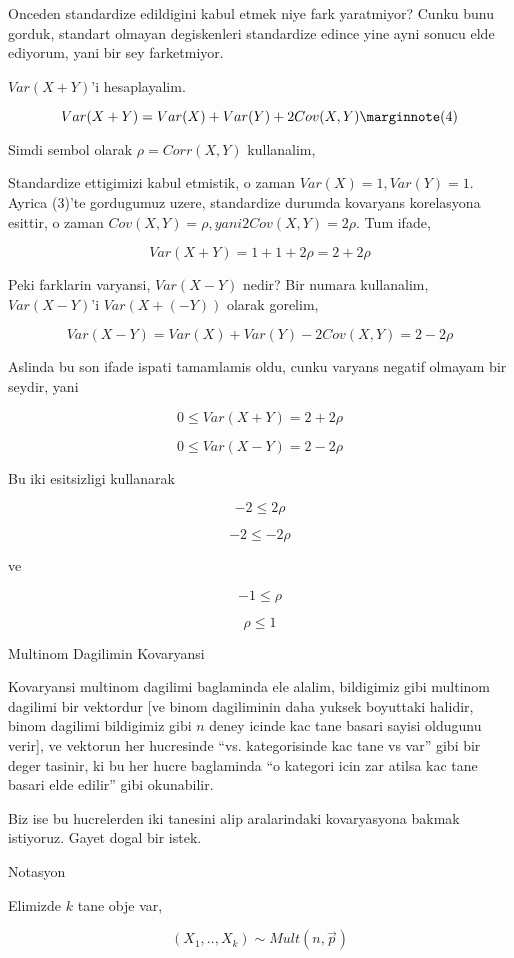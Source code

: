 \documentclass[12pt,fleqn]{article}\usepackage{../common}
\begin{document}
Onceden standardize edildigini kabul etmek niye fark yaratmiyor? Cunku bunu
gorduk, standart olmayan degiskenleri standardize edince yine ayni sonucu
elde ediyorum, yani bir sey farketmiyor. 

$Var(X+Y)$'i hesaplayalim. 

$$ Var(X+Y) = Var(X) + Var(Y) + 2Cov(X,Y) 
\mlabel{4}
$$

Simdi sembol olarak $\rho = Corr(X,Y)$ kullanalim,

Standardize ettigimizi kabul etmistik, o zaman $Var(X)=1,Var(Y)=1$. Ayrica
(3)'te gordugumuz uzere, standardize durumda kovaryans korelasyona esittir,
o zaman $Cov(X,Y)=\rho, yani 2Cov(X,Y) = 2\rho$. Tum ifade,

$$ Var(X+Y) = 1 + 1 + 2 \rho  = 2 + 2\rho$$

Peki farklarin varyansi, $Var(X-Y)$ nedir? Bir numara kullanalim,
$Var(X-Y)$'i $Var(X+(-Y))$ olarak gorelim, 

$$ Var(X-Y) = Var(X) + Var(Y) - 2Cov(X,Y) = 2 - 2\rho $$

Aslinda bu son ifade ispati tamamlamis oldu, cunku varyans negatif olmayam
bir seydir, yani 

$$ 0 \le Var(X+Y) = 2 + 2\rho$$

$$ 0 \le Var(X-Y) = 2 - 2\rho$$

Bu iki esitsizligi kullanarak 

$$ -2 \le 2\rho$$

$$ -2 \le - 2\rho$$

ve 

$$ -1 \le \rho$$

$$ \rho \le 1 $$


Multinom Dagilimin Kovaryansi

Kovaryansi multinom dagilimi baglaminda ele alalim, bildigimiz gibi
multinom dagilimi bir vektordur [ve binom dagiliminin daha yuksek boyuttaki
halidir, binom dagilimi bildigimiz gibi $n$ deney icinde kac tane basari
sayisi oldugunu verir], ve vektorun her hucresinde ``vs. kategorisinde kac
tane vs var'' gibi bir deger tasinir, ki bu her hucre baglaminda ``o
kategori icin zar atilsa kac tane basari elde edilir'' gibi okunabilir. 

Biz ise bu hucrelerden iki tanesini alip aralarindaki kovaryasyona bakmak
istiyoruz. Gayet dogal bir istek. 

Notasyon

Elimizde $k$ tane obje var, 

$$ (X_1,..,X_k) \sim Mult(n,\vec{p}) $$
\end{document}
